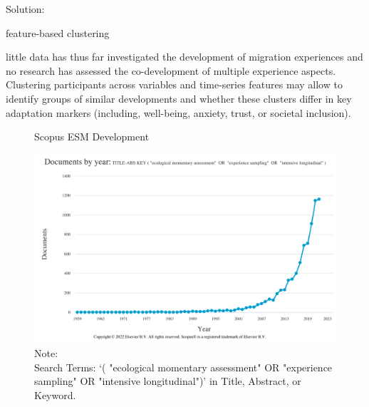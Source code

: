 \documentclass[man, 12pt, a4paper]{apa7}
\theoremstyle{break}
\theoremstyle{plain}
\begin{document}
Solution:   

feature-based clustering

little data has thus far investigated the development of migration experiences and no research has assessed the co-development of multiple experience aspects. Clustering participants across variables and time-series features may allow to identify groups of similar developments and whether these clusters differ in key adaptation markers (including, well-being, anxiety, trust, or societal inclusion).




%



\begin{figure}[hbtp]
  \caption{Scopus ESM Development}
  \label{fig:ScopusEsm}
  \centering\includegraphics[width=\textwidth]{figures/Scopus-ESM-Development.png}
  \caption*{Note: \\
  Search Terms: `( "ecological momentary assessment"  OR  "experience sampling"  OR  "intensive longitudinal")' in Title, Abstract, or Keyword.}
\end{figure}
\end{document}

